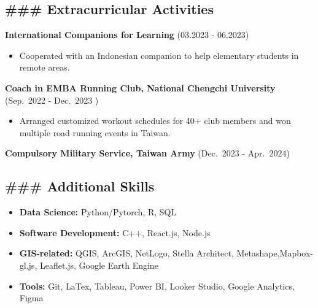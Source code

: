 \subsection{\#\#\# Extracurricular
Activities}\label{extracurricular-activities}

\textbf{International Companions for Learning} (03.2023 - 06.2023)

\begin{itemize}
\tightlist
\item
  Cooperated with an Indonesian companion to help elementary students in
  remote areas.
\end{itemize}

\textbf{Coach in EMBA Running Club, National Chengchi University}
(Sep.~2022 - Dec.~2023 )

\begin{itemize}
\tightlist
\item
  Arranged customized workout schedules for 40+ club members and won
  multiple road running events in Taiwan.
\end{itemize}

\textbf{Compulsory Military Service, Taiwan Army} (Dec.~2023 -
Apr.~2024)

\subsection{\#\#\# Additional Skills}\label{additional-skills}

\begin{itemize}
\item
  \textbf{Data Science:} Python/Pytorch, R, SQL
\item
  \textbf{Software Development:} C++, React.js, Node.js
\item
  \textbf{GIS-related:} QGIS, ArcGIS, NetLogo, Stella Architect,
  Metashape,Mapbox-gl.js, Leaflet.js, Google Earth Engine
\item
  \textbf{Tools:} Git, LaTex, Tableau, Power BI, Looker Studio, Google
  Analytics, Figma
\end{itemize}
